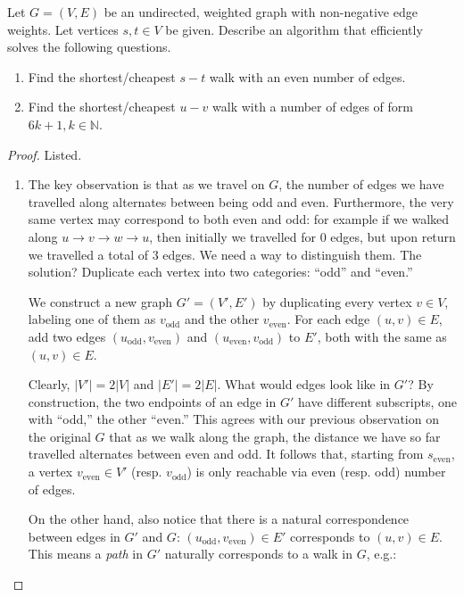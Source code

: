 \documentclass{article}
\begin{document}
    \begin{exercise}
      Let $G=(V,E)$ be an undirected, weighted graph with non-negative edge weights. Let vertices $s,t\in V$ be given. Describe an algorithm that efficiently solves the following questions.
      \begin{enumerate}
        \item Find the shortest/cheapest $s-t$ walk with an even number of edges.
        \item Find the shortest/cheapest $u-v$ walk with a number of edges of form $6k+1, k\in \mathbb{N}$. 
      \end{enumerate}
    \end{exercise}
    \begin{proof}
      Listed. 
      \begin{enumerate}
        \item The key observation is that as we travel on $G$, the number of edges we have travelled along alternates between being odd and even. Furthermore, the very same vertex may correspond to both even and odd: for example if we walked along $u\to v\to w\to u$, then initially we travelled for $0$ edges, but upon return we travelled a total of $3$ edges. We need a way to distinguish them. The solution? Duplicate each vertex into two categories: ``odd'' and ``even.''

        We construct a new graph $G' = (V', E')$ by duplicating every vertex $v\in V$, labeling one of them as $v_{\text{odd}}$ and the other $v_{\text{even}}$. For each edge $(u,v)\in E$, add two edges $(u_{\text{odd}}, v_\text{even})$ and $(u_{\text{even}}, v_{\text{odd}})$ to $E'$, both with the same as $(u,v)\in E$. 

        Clearly, $\lvert V'\rvert  = 2 \lvert V\rvert $ and $\lvert E'\rvert  = 2 \lvert E\rvert $. What would edges look like in $G'$? By construction, the two endpoints of an edge in $G'$ have different subscripts, one with ``odd,'' the other ``even.'' This agrees with our previous observation on the original $G$ that as we walk along the graph, the distance we have so far travelled alternates between even and odd. It follows that, starting from $s_\text{even}$, a vertex $v_\text{even}\in V'$ (resp. $v_\text{odd}$) is only reachable via even (resp. odd) number of edges. 

        On the other hand, also notice that there is a natural correspondence between edges in $G'$ and $G$: $(u_\text{odd}, v_\text{even})\in E'$ corresponds to $(u,v)\in E$. This means a \textit{path} in $G'$ naturally corresponds to a walk in $G$, e.g.:


\end{enumerate}
\end{proof}
\end{document}
